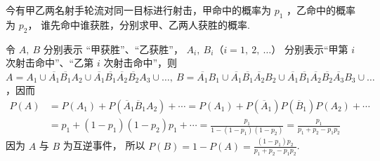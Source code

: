 \begin{problem}[本题12分]
  今有甲乙两名射手轮流对同一目标进行射击，甲命中的概率为 $p_1$ ，乙命中的概率为 $p_2$，
  谁先命中谁获胜，分别求甲、乙两人获胜的概率.
\end{problem}
\scratch[22ex]
\begin{solution}
  令 $A,~ B$ 分别表示 ``甲获胜''、``乙获胜''， $A_i,~ B_i$（$i = 1,~ 2,~ \ldots$）
  分别表示``甲第 $i$ 次射击命中''、``乙第 $i$ 次射击命中''，则
  $
    A = A_1 \cup \overline{A_1} \overline{B_1} A_2 \cup
        \overline{A_1} \overline{B_1} \overline{A_2} \overline{B_2} A_3 \cup
        \ldots,~
    B = \overline{A_1} B_1 \cup
        \overline{A_1} \overline{B_1} \overline{A_2} B_2 \cup
        \overline{A_1} \overline{B_1} \overline{A_2}
        \overline{B_2} \overline{A_3} B_3 \cup \ldots
  $，因而
  \begin{align*}
    P(A)& = P(A_1) + P(\overline A_1 \overline B_1 A_2) + \cdots
          = P(A_1) + P(\overline A_1) P(\overline B_1) P(A_2) + \cdots \\
        & = p_1 + (1 - p_1)(1 - p_2) p_1 + \cdots
          = \frac{p_1}{1 - (1 - p_1)(1 - p_2)} = \frac{p_1}{p_1 + p_2 - p_1 p_2}
  \end{align*}
  因为 $A$ 与 $B$ 为互逆事件，
  所以 $P(B) = 1 - P(A) = \frac{(1 - p_1) p_2}{p_1 + p_2 - p_1 p_2}$.
\end{solution}

